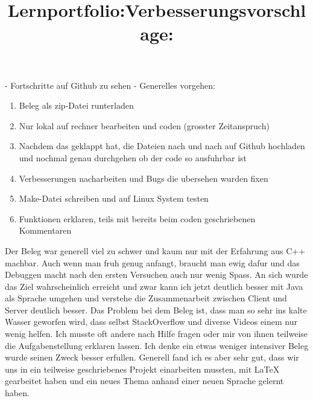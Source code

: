 \documentclass [12pt]{article}
\newcommand{\mycomment}[1]{}
\begin{document}
\title{Lernportfolio:}
\maketitle
\newline\newline
- Fortschritte auf Github zu sehen\newline\newline
- Generelles vorgehen:
\begin{enumerate}
	\item Beleg als zip-Datei runterladen
	\item Nur lokal auf rechner bearbeiten und coden (grosster Zeitanspruch)
	\item Nachdem das geklappt hat, die Dateien nach und nach auf Github hochladen und nochmal genau durchgehen ob der code so ausfuhrbar ist
	\item Verbesserungen nacharbeiten und Bugs die ubersehen wurden fixen 
	\item Make-Datei schreiben und auf Linux System testen
	\item Funktionen erklaren, teils mit bereits beim coden geschriebenen Kommentaren\newline
\end{enumerate}


\title{Verbesserungsvorschlage:}
\maketitle
\newline\newline
Der Beleg war generell viel zu schwer und kaum nur mit der Erfahrung aus C++ machbar. Auch wenn man fruh genug anfangt, braucht man ewig dafur und das Debuggen macht nach den ersten Versuchen auch nur wenig Spass. An sich wurde das Ziel wahrscheinlich erreicht und zwar kann ich jetzt deutlich besser mit Java als Sprache umgehen und verstehe die Zusammenarbeit zwischen Client und Server deutlich besser. Das Problem bei dem Beleg ist, dass man so sehr ins kalte Wasser geworfen wird, dass selbst StackOverflow und diverse Videos einem nur wenig helfen. Ich musste oft andere nach Hilfe fragen oder mir von ihnen teilweise die Aufgabenstellung erklaren lassen. Ich denke ein etwas weniger intensiver Beleg wurde seinen Zweck besser erfullen. Generell fand ich es aber sehr gut, dass wir uns in ein teilweise geschriebenes Projekt einarbeiten mussten, mit LaTeX gearbeitet haben und ein neues Thema anhand einer neuen Sprache gelernt haben. 













\mycomment{
\begin{lstlisting}
// Hello.java
import javax.swing.JApplet;
import java.awt.Graphics;

public class Hello extends JApplet {
    public void paintComponent(Graphics g) {
        g.drawString("Hello, world!", 65, 95);
    }    
}
\end{lstlisting}
}
\end{document}
